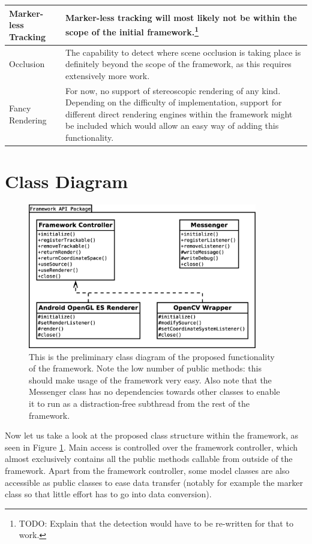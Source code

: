 \begin{tabulary}{\textwidth}{L || L}
Marker-less Tracking & Marker-less tracking will most likely not be within the scope of the initial framework.\footnote{TODO: Explain that the detection would have to be re-written for that to work.}\\
\hline
Occlusion & The capability to detect where scene occlusion is taking place is definitely beyond the scope of the framework, as this requires extensively more work.\\
\hline
Fancy Rendering & For now, no support of stereoscopic rendering of any kind. Depending on the difficulty of implementation, support for different direct rendering engines within the framework might be included which would allow an easy way of adding this functionality.\\
\end{tabulary}

\section{Class Diagram}

\begin{figure}
	\centering
	\includegraphics[width=10cm]{img/class_diagram.eps}
	\caption[General Class Diagram]{This is the preliminary class diagram of the proposed functionality of the framework. Note the low number of public methods: this should make usage of the framework very easy. Also note that the Messenger class has no dependencies towards other classes to enable it to run as a distraction-free subthread from the rest of the framework.}
	\label{fig:class_diagram}
\end{figure}

Now let us take a look at the proposed class structure within the framework, as seen in Figure \ref{fig:class_diagram}.
Main access is controlled over the framework controller, which almost exclusively contains all the public methods callable from outside of the framework.
Apart from the framework controller, some model classes are also accessible as public classes to ease data transfer (notably for example the marker class so that little effort has to go into data conversion).

